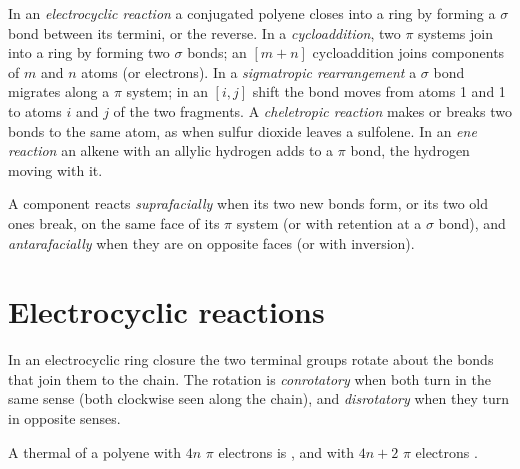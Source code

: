 \begin{definition}\label{def:b3:pericyclic:families}
In an \emph{electrocyclic reaction} a conjugated
polyene closes into a ring by forming a $\sigma$ bond between its termini, or the
reverse. In a \emph{cycloaddition}, two $\pi$ systems join
into a ring by forming two $\sigma$ bonds; an $[m + n]$ cycloaddition joins components
of $m$ and $n$ atoms (or electrons). In a \emph{sigmatropic
rearrangement} a $\sigma$ bond migrates along a $\pi$
system; in an $[i, j]$ shift the bond moves from atoms 1 and 1 to atoms $i$ and $j$
of the two fragments. A \emph{cheletropic reaction}
makes or breaks two bonds to the same atom, as when sulfur dioxide
leaves a sulfolene. In an \emph{ene reaction} an alkene
with an allylic hydrogen adds to a $\pi$ bond, the hydrogen moving with it.
\end{definition}

\begin{definition}\label{def:b3:pericyclic:faciality}
A component reacts \emph{suprafacially} when its two new
bonds form, or its two old ones break, on the same face of its $\pi$ system (or with
retention at a $\sigma$ bond), and \emph{antarafacially} when they
are on opposite faces (or with inversion).
\end{definition}

\section{Electrocyclic reactions}

\begin{definition}\label{def:b3:pericyclic:rotation-modes}
In an electrocyclic ring closure the two terminal groups rotate about the bonds
that join them to the chain. The rotation is \emph{conrotatory}
when both turn in the same sense (both clockwise seen along the chain), and
\emph{disrotatory} when they turn in opposite senses.
\end{definition}

\begin{theorem}\label{thm:b3:pericyclic:electrocyclic}
A thermal  of a polyene with $4n$ $\pi$ electrons is
, and with $4n + 2$ $\pi$ electrons .
\end{theorem}

